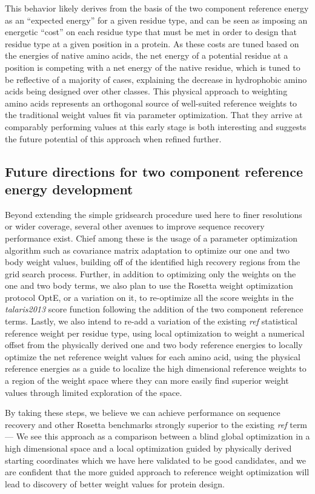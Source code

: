 This behavior likely derives from the basis of the two component reference energy as an ``expected energy'' for a given residue type, and can be seen as imposing an energetic ``cost'' on each residue type that must be met in order to design that residue type at a given position in a protein.
As these costs are tuned based on the energies of native amino acids, the net energy of a potential residue at a position is competing with a net energy of the native residue, which is tuned to be reflective of a majority of cases, explaining the decrease in hydrophobic amino acids being designed over other classes.
This physical approach to weighting amino acids represents an orthogonal source of well-suited reference weights to the traditional weight values fit via parameter optimization.
That they arrive at comparably performing values at this early stage is both interesting and suggests the future potential of this approach when refined further.

\subsection{Future directions for two component reference energy development}
Beyond extending the simple gridsearch procedure used here to finer resolutions or wider coverage, several other avenues to improve sequence recovery performance exist.
Chief among these is the usage of a parameter optimization algorithm such as covariance matrix adaptation\cite{ostermeier_step-size_1994} to optimize our one and two body weight values, building off of the identified high recovery regions from the grid search process.
Further, in addition to optimizing only the weights on the one and two body terms, we also plan to use the Rosetta weight optimization protocol OptE\cite{leaver-fay_chapter_2013}, or a variation on it, to re-optimize all the score weights in the \textit{talaris2013} score function following the addition of the two component reference terms.
Lastly, we also intend to re-add a variation of the existing \textit{ref} statistical reference weight per residue type, using local optimization to weight a numerical offset from the physically derived one and two body reference energies to locally optimize the net reference weight values for each amino acid, using the physical reference energies as a guide to localize the high dimensional reference weights to a region of the weight space where they can more easily find superior weight values through limited exploration of the space.

By taking these steps, we believe we can achieve performance on sequence recovery and other Rosetta benchmarks strongly superior to the existing \textit{ref} term---
We see this approach as a comparison between a blind global optimization in a high dimensional space and a local optimization guided by physically derived starting coordinates which we have here validated to be good candidates, and we are confident that the more guided approach to reference weight optimization will lead to discovery of better weight values for protein design.
